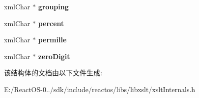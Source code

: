 \begin{DoxyCompactItemize}
\item 
\mbox{\label{struct__xslt_decimal_format_aa8a6c87edeee426e38a55cfdad761602}} 
xml\+Char $\ast$ {\bfseries grouping}
\item 
\mbox{\label{struct__xslt_decimal_format_a9e7bac792099639c848b6022b0ff4f4b}} 
xml\+Char $\ast$ {\bfseries percent}
\item 
\mbox{\label{struct__xslt_decimal_format_a9467cf5eb5cb8c6ad075517d49c79429}} 
xml\+Char $\ast$ {\bfseries permille}
\item 
\mbox{\label{struct__xslt_decimal_format_ab6dfe999daf44151377e37b5976c7eac}} 
xml\+Char $\ast$ {\bfseries zero\+Digit}
\end{DoxyCompactItemize}


该结构体的文档由以下文件生成\+:\begin{DoxyCompactItemize}
\item 
E\+:/\+React\+O\+S-\/0../sdk/include/reactos/libs/libxslt/xslt\+Internals.\+h\end{DoxyCompactItemize}
